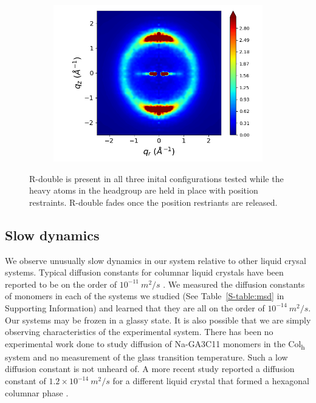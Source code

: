 \documentclass[journal=jpcbfk,manusciprt=article]{achemso}
\begin{document}
\begin{figure}[htb]
\begin{subfigure}{0.3\linewidth}
  	\includegraphics[width=\textwidth]{rotated_monomers_rzplot_norestraints.png}
  	\caption{}\label{fig:rotated_monomers_rzplot_norestraints}
  \end{subfigure}
  \caption{R-double is present in all three inital configurations tested while the heavy atoms
  in the headgroup are held in place with position restraints. R-double fades once 
  the position restriants are released.}\label{fig:rdouble}
  \end{figure}
  
  \subsection{Slow dynamics}

  We observe unusually slow dynamics in our system relative to other liquid crysal
  systems. Typical diffusion constants for columnar liquid crystals have been reported
  to be on the order of $10^{-11}~ m^2/s$ \cite{dong_translational_1984}. We measured the diffusion
  constants of monomers in each of the systems we studied (See Table~\ref{S-table:msd}
  in Supporting Information) and learned that they are all on the order of $10^{-14}~m^2/s$.
  Our systems may be frozen in a glassy state. It is also possible that we are simply 
  observing characteristics of the experimental system. There has been no experimental work
  done to study diffusion of Na-GA3C11 monomers in the Col\textsubscript{h}
  system and no measurement of the glass transition temperature. Such a low
  diffusion constant is not unheard of. A more recent study reported a diffusion
  constant of $1.2\times10^{-14}~m^2/s$ for a different liquid crystal that
  formed a hexagonal columnar phase \cite{dvinskikh_molecular_2002}. 
\end{document}
